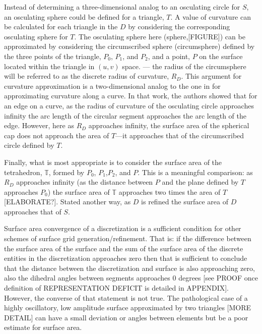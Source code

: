 Instead of determining a three-dimensional analog to an osculating
circle for $S$, an osculating sphere could be defined for a triangle,
$T$. A value of curvature can be calculated for each triangle in the $D$
by considering the corresponding osculating sphere for $T$. The
osculating sphere here (sphere,[FIGURE]) can be approximated by
considering the circumscribed sphere (circumsphere) \cite{casey1888}
defined by the three points of the triangle, $P_0$, $P_1$, and $P_2$,
and a point, $P$ on the surface located within the triangle in $(u,v)$
space. --- the radius of the circumsphere will be referred to as the
discrete radius of curvature, $R_D$. This argument for curvature
approximation is a two-dimensional analog to the one in
\cite{mclaurin12} for approximating curvature along a curve. In that
work, the authors showed that for an edge on a curve, as the radius of
curvature of the osculating circle approaches infinity the arc length of
the circular segment approaches the arc length of the edge. However,
here as $R_D$ approaches infinity, the surface area of the spherical cap
does not approach the area of $T$---it approaches that of the
circumscribed circle defined by $T$.

Finally, what is most appropriate is to consider the surface area of the
tetrahedron, ${\mathbb T}$, formed by $P_0$, $P_1$,$P_2$, and $P$. This
is a meaningful comparison: as $R_D$ approaches infinity (as the
distance between $P$ and the plane defined by $T$ approaches $P_0$) the
surface area of ${\mathbb T}$ approaches two times the area of
$T$[ELABORATE?].  Stated another way, as $D$ is refined the surface area
of $D$ approaches that of $S$.

Surface area convergence of a discretization is a sufficient condition
for other schemes of surface grid generation/refinement. That is: if the
difference between the surface area of the surface and the sum of the
surface area of the discrete entities in the discretization approaches
zero then that is sufficient to conclude that the distance between the
discretization and surface is also approaching zero, also the dihedral
angles between segments approaches $0$ degrees [see PROOF once
definition of REPRESENTATION DEFICIT is detailed in APPENDIX]. However,
the converse of that statement is not true. The pathological case of a
highly oscillatory, low amplitude surface approximated by two triangles
[MORE DETAIL] can have a small deviation or angles between elements
but be a poor estimate for surface area.
